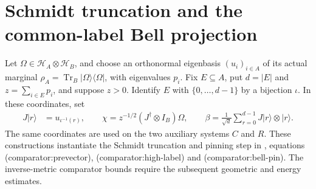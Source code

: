\section{Schmidt truncation and the common-label Bell projection}
\label{sec:schmidt_bell_prevector}

Let $\Omega\in\mathcal H_A\otimes\mathcal H_B$, and choose an orthonormal
eigenbasis $(u_i)_{i\in A}$ of its actual marginal
$\rho_A=\operatorname{Tr}_B|\Omega\rangle\langle\Omega|$, with eigenvalues
$p_i$. Fix $E\subseteq A$, put $d=|E|$ and $z=\sum_{i\in E}p_i$, and suppose
$z>0$. Identify $E$ with $\{0,\ldots,d-1\}$ by a bijection $\iota$.
In these coordinates, set
\begin{align}
 J|r\rangle&=u_{\iota^{-1}(r)},\qquad
 \chi=z^{-1/2}(J^\dagger\otimes I_B)\Omega,\qquad
 \beta=\frac1{\sqrt d}\sum_{r=0}^{d-1}J|r\rangle\otimes|r\rangle.
 \label{eq:schmidt_bell_selected_vectors}
\end{align}
The same coordinates are used on the two auxiliary systems $C$ and $R$.
These constructions instantiate the Schmidt truncation and pinning step in
\cite[Section~7]{OpenAI2026AreaLaw}, equations
\textup{(comparator:prevector)}, \textup{(comparator:high-label)} and
\textup{(comparator:bell-pin)}.
The inverse-metric comparator bounds require the subsequent geometric and
energy estimates.


